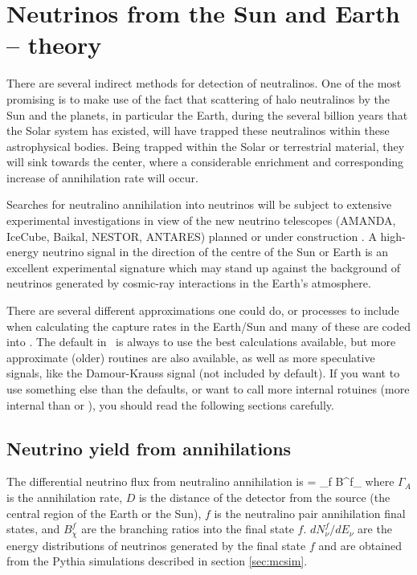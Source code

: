 \section{Neutrinos from the Sun and Earth --  theory}

There are several indirect methods for detection of neutralinos.
One of the most promising \cite{neutrinos} is to make use of the
fact that scattering of halo neutralinos by the Sun and the planets,
in particular the Earth, during the several
billion years that the Solar system has existed, will have trapped
these neutralinos within these astrophysical bodies. Being trapped
within the Solar or terrestrial material, they will sink towards
the center, where a considerable enrichment and corresponding
increase of annihilation rate will occur.


Searches for neutralino annihilation into neutrinos
will be subject to  extensive experimental investigations in view
of the new neutrino telescopes (AMANDA, IceCube, Baikal, NESTOR, ANTARES)
planned or under construction \cite{halzen}. A high-energy
neutrino signal in the direction of the centre of the Sun or Earth
is an excellent experimental signature which may stand up against
the background of neutrinos generated by cosmic-ray interactions in the
Earth's atmosphere.

There are several different approximations one could do, or processes to
include when calculating the capture rates in the Earth/Sun and many of these
are coded into \ds. The default in \ds\ is always to use the best calculations
available, but more approximate (older) routines are also available,
as well as more speculative signals, like the Damour-Krauss signal
(not included by default). If you want to use something else than the
defaults, or want to call more internal rotuines (more internal than
 or ), you should read the
following sections carefully.


\subsection{Neutrino yield from annihilations}

The differential neutrino flux from neutralino annihilation is
\beq
{} =
 \sum_{f}
B^{f}_{\chi}
\eeq
where $\Gamma_A$ is the annihilation rate,
$D$ is the distance of the detector from the source (the
central region of the Earth or the Sun), $f$ is the neutralino pair
annihilation final states,
and $B^{f}_{\chi}$ are the branching ratios into the final state $f$.
  $dN^f_\nu/dE_{\nu}$ are the energy
distributions of  neutrinos generated by the final state $f$ and are
obtained from the {\sc Pythia} simulations described in section
\ref{sec:mcsim}.

